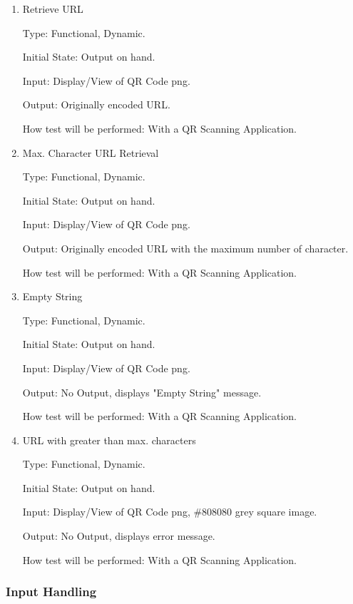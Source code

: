 \documentclass[12pt, titlepage]{article}
\begin{document}
\begin{enumerate}

\item{Retrieve URL\\}

Type: Functional, Dynamic.
					
Initial State: Output on hand.
					
Input: Display/View of QR Code png.
					
Output: Originally encoded URL.
					
How test will be performed: With a QR Scanning Application.
					
\item{Max. Character URL Retrieval \\}

Type: Functional, Dynamic.
			
Initial State: Output on hand.
					
Input: Display/View of QR Code png.
					
Output: Originally encoded URL with the maximum number of character.  
					
How test will be performed: With a QR Scanning Application.


\item{Empty String\\}

Type: Functional, Dynamic.
					
Initial State: Output on hand.
					
Input: Display/View of QR Code png. 
					
Output: No Output, displays "Empty String" message.
					
How test will be performed: With a QR Scanning Application.


\item{URL with greater than max. characters\\}

Type: Functional, Dynamic.
					
Initial State: Output on hand.
					
Input: Display/View of QR Code png, \#808080 grey square image.
					
Output: No Output, displays error message.
					
How test will be performed: With a QR Scanning Application.

\end{enumerate}

\subsubsection{Input Handling}
\end{document}
